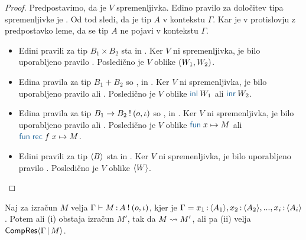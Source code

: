 \begin{proof}
	Predpostavimo, da je $V$ spremenljivka. Edino pravilo za določitev tipa spremenljivke je .
	Od tod sledi, da je tip $A$ v kontekstu $\Gamma$. Kar je v protislovju z predpostavko leme, da se tip $A$ ne pojavi v kontekstu $\Gamma$.
	\begin{itemize}
		\item Edini pravili za tip $B_1 \times B_2$ sta  in .
		Ker $V$ ni spremenljivka, je bilo uporabljeno pravilo .
		Posledično je $V$ oblike $( W_1 , W_2 )$.
		
		\item Edina pravila za tip $B_1 + B_2$ so ,  in .
		Ker $V$ ni spremenljivka, je bilo uporabljeno pravilo  ali .
		Posledično je $V$ oblike $\tminl{W_1}$ ali $\tminr{W_2}$.
		
		\item Edina pravila za tip $B_1 \to B_2 \mathbin{!} (o, \iota)$ so ,  in .
		Ker $V$ ni spremenljivka, je bilo uporabljeno pravilo  ali .
		Posledično je $V$ oblike $\tmfunano{x}{M}$ ali $\tmfunrecano{f}{x}{M}$.
		
		\item Edini pravili za tip $\langle B \rangle$ sta  in .
		Ker $V$ ni spremenljivka, je bilo uporabljeno pravilo .
		Posledično je $V$ oblike $\langle W \rangle$.
	\end{itemize}
\end{proof}


\begin{trditev}[o napredku]\label{trd:gamma-napredek}
	Naj za izračun $M$ velja $\Gamma \vdash M \mathinner{:} A \mathbin{!} (o, \iota)$, kjer je $\Gamma = x_1 \mathinner{:} \langle A_1 \rangle, x_2 \mathinner{:} \langle A_2 \rangle,..., x_i \mathinner{:} \langle A_i \rangle$. Potem ali (i) obstaja izračun $M'$, tak da $M \leadsto M'$, ali pa (ii) velja $\mathsf{CompRes}\langle\Gamma \,\vert\, M\rangle$.
\end{trditev}

